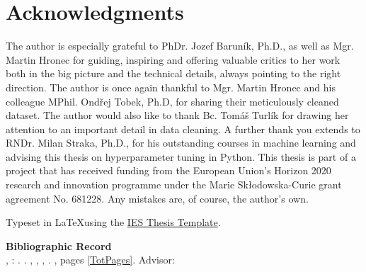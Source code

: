 \section*{Acknowledgments}
The author is especially grateful to PhDr. Jozef Barun\'{i}k, Ph.D., as well as Mgr. Martin Hronec for guiding, inspiring and offering valuable critics to her work both in the big picture and the technical details, always pointing to the right direction. The author is once again thankful to Mgr. Martin Hronec and his colleague MPhil. Ond\v{r}ej Tobek, Ph.D, for sharing their meticulously cleaned dataset. The author would also like to thank Bc. Tom\'{a}\v{s} Turl\'{i}k for drawing her attention to an important detail in data cleaning. A further thank you extends to RNDr. Milan Straka, Ph.D., for his outstanding courses in machine learning and advising this thesis on hyperparameter tuning in Python. This thesis is part of a project that has received funding from the European Union’s Horizon 2020 research and innovation programme under the Marie Skłodowska-Curie grant agreement No. 681228. Any mistakes are, of course, the author's own. 


\vfill

\noindent Typeset in \LaTeX  using the \href{https://is.cuni.cz/studium/eng/predmety/index.php?do=predmet&kod=JEM001}{IES Thesis Template}. 

\bigskip

\noindent \textbf{Bibliographic Record} \\
\LastNameDP, \FirstNameDP: \emph{\Bookname}. \BookName. \CUNI, \FSS, \IES, \Place. \Year, pages \ref*{TotPages}. Advisor: \Supervisor


